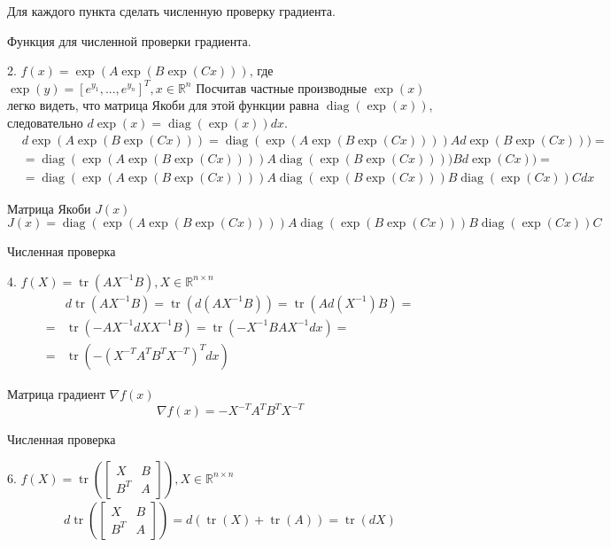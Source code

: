 \documentclass{article}
\DeclareMathOperator{\diag}{diag}
\DeclareMathOperator{\tr}{tr}
\begin{document}
    Для каждого пункта сделать численную проверку градиента.
    \bigbreak
    
    Функция для численной проверки градиента.
    
    \bigbreak
    
    2. $f(x) = \exp(A\exp(B\exp(Cx)))$, где $\exp(y) = [e^{y_1}, ..., e^{y_n}]^T, x \in \mathbb{R}^n$
    \bigbreak
    Посчитав частные производные $\exp(x)$ легко видеть, что матрица Якоби для этой функции равна $\diag(\exp(x))$, следовательно $d\exp(x) = \diag(\exp(x))dx$.    
    \begin{align*}
        &d\exp(A\exp(B\exp(Cx))) = \diag(\exp(A\exp(B\exp(Cx))))Ad\exp(B\exp(Cx)))=\\
        &= \diag(\exp(A\exp(B\exp(Cx))))A\diag(\exp(B\exp(Cx))))Bd\exp(Cx)) = \\
        &= \diag(\exp(A\exp(B\exp(Cx))))A\diag(\exp(B\exp(Cx)))B\diag(\exp(Cx))Cdx
    \end{align*}
    
    Матрица Якоби $J(x)$
    \begin{equation*}
         J(x) = \diag(\exp(A\exp(B\exp(Cx))))A\diag(\exp(B\exp(Cx)))B\diag(\exp(Cx))C
    \end{equation*}
    
    Численная проверка
    
    \bigbreak
    
    4. $f(X) = \tr(AX^{-1}B), X \in \mathbb{R}^{n \times n}$
    \begin{align*}
        &d\tr(AX^{-1}B) = \tr(d(AX^{-1}B)) = \tr(Ad(X^{-1})B) =\\
        = &\tr(-AX^{-1}dXX^{-1}B) = \tr(-X^{-1}BAX^{-1}dx) =\\
        = &\tr(-(X^{-T}A^TB^TX^{-T})^Tdx)
    \end{align*}
    
    Матрица градиент $\nabla f(x)$
    \begin{equation*}
         \nabla f(x) = -X^{-T}A^TB^TX^{-T}
    \end{equation*}
    
    Численная проверка
    
    \newpage
    
    6. $f(X) = \tr\left(\left[
                \begin{matrix}
                X & B\\
                B^T & A
                \end{matrix}
                \right]\right), X \in \mathbb{R}^{n \times n}$
    \begin{align*}
        d\tr\left(\left[
                \begin{matrix}
                X & B\\
                B^T & A
                \end{matrix}
                \right]\right) = d(\tr(X) + \tr(A)) = \tr(dX)
    \end{align*}
    
\end{document}
